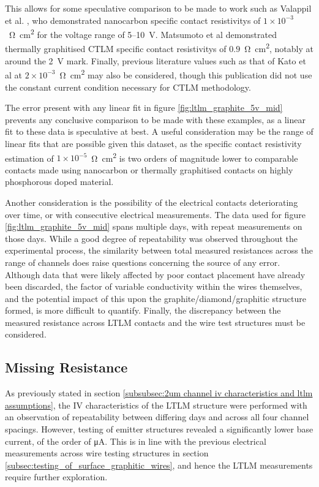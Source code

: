 \begin{refsection}
This allows for some speculative comparison to be made to work such as Valappil et al. \cite{valappil2022, valappil2023}, who demonstrated nanocarbon specific contact resistivitys of $1\times10^{-3}$~\si{\ohm\centi\metre\squared} for the voltage range of 5--10~\si{\volt}. Matsumoto et al \cite{matsumoto2013} demonstrated thermally graphitised CTLM specific contact resistivitys of $0.9$~\si{\ohm\centi\metre\squared}, notably at around the 2~\si{\volt} mark. Finally, previous literature values such as that of Kato et al \cite{kato2009} at $2\times10^{-3}$~\si{\ohm\centi\metre\squared} may also be considered, though this publication did not use the constant current condition necessary for CTLM methodology.

The error present with any linear fit in figure \ref{fig:ltlm_graphite_5v_mid} prevents any conclusive comparison to be made with these examples, as a linear fit to these data is speculative at best. A useful consideration may be the range of linear fits that are possible given this dataset, as the specific contact resistivity estimation of $1\times10^{-5}$~\si{\ohm\centi\metre\squared} is two orders of magnitude lower to comparable contacts made using nanocarbon or thermally graphitised contacts on highly phosphorous doped material.

Another consideration is the possibility of the electrical contacts deteriorating over time, or with consecutive electrical measurements. The data used for figure \ref{fig:ltlm_graphite_5v_mid} spans multiple days, with repeat measurements on those days. While a good degree of repeatability was observed throughout the experimental process, the similarity between total measured resistances across the range of channels does raise questions concerning the source of any error. Although data that were likely affected by poor contact placement have already been discarded, the factor of variable conductivity within the wires themselves, and the potential impact of this upon the graphite/diamond/graphitic structure formed, is more difficult to quantify. Finally, the discrepancy between the measured resistance across LTLM contacts and the wire test structures must be considered. 

\subsection{Missing Resistance}
\label{subsubsec:missing_resistance}
As previously stated in section \ref{subsubsec:2um channel iv characteristics and ltlm assumptions}, the IV characteristics of the LTLM structure were performed with an observation of repeatability between differing days and across all four channel spacings. However, testing of emitter structures revealed a significantly lower base current, of the order of \si{\micro\ampere}. This is in line with the previous electrical measurements across wire testing structures in section \ref{subsec:testing_of_surface_graphitic_wires}, and hence the LTLM measurements require further exploration.
\clearpage


\end{refsection}
